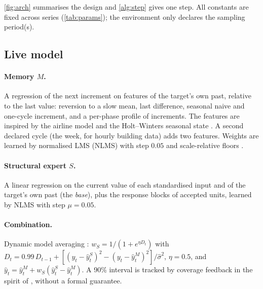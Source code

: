 \documentclass[11pt]{article}
\theoremstyle{remark}
\begin{document}
\cref{fig:arch} summarises the design and \cref{alg:step} gives one step. All constants are fixed across series (\cref{tab:params}); the environment only declares the sampling period(s).

\subsection{Live model}
\paragraph{Memory $M$.} A regression of the next increment on features of the target's own past, relative to the last value: reversion to a slow mean, last difference, seasonal naive and one-cycle increment, and a per-phase profile of increments. The features are inspired by the airline model and the Holt--Winters seasonal state \citep{boxjenkins1970,hyndman2008ets}. A second declared cycle (the week, for hourly building data) adds two features. Weights are learned by normalised LMS (NLMS) with step $0.05$ and scale-relative floors \citep{widrow1985,haykin2002}.
\paragraph{Structural expert $S$.} A linear regression on the current value of each standardised input and of the target's own past (the \emph{base}), plus the response blocks of accepted units, learned by NLMS with step $\mu=0.05$.
\paragraph{Combination.} Dynamic model averaging \citep{raftery2010dma}: $w_S = 1/(1+e^{\eta D_t})$ with $D_t = 0.99\,D_{t-1} + [(y_t-\hat y^S_t)^2-(y_t-\hat y^M_t)^2]/\hat\sigma^2$, $\eta=0.5$, and $\hat y_t = \hat y^M_t + w_S(\hat y^S_t-\hat y^M_t)$. A 90\% interval is tracked by coverage feedback in the spirit of \citet{gibbs2021aci}, without a formal guarantee.
\end{document}
